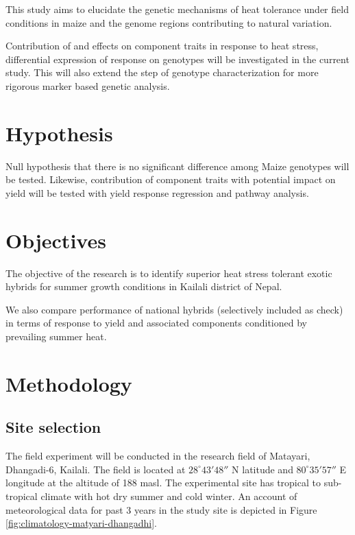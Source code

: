 \documentclass[
]{article}
\begin{document}
This study aims to elucidate the genetic mechanisms of heat tolerance under field conditions in maize and the genome regions contributing to natural variation.

Contribution of and effects on component traits in response to heat stress, differential expression of response on genotypes will be investigated in the current study. This will also extend the step of genotype characterization for more rigorous marker based genetic analysis.

\hypertarget{hypothesis}{%
\section{Hypothesis}\label{hypothesis}}

Null hypothesis that there is no significant difference among Maize genotypes will be tested. Likewise, contribution of component traits with potential impact on yield will be tested with yield response regression and pathway analysis.

\hypertarget{objectives}{%
\section{Objectives}\label{objectives}}

The objective of the research is to identify superior heat stress tolerant exotic hybrids for summer growth conditions in Kailali district of Nepal.

We also compare performance of national hybrids (selectively included as check) in terms of response to yield and associated components conditioned by prevailing summer heat.

\hypertarget{methodology}{%
\section{Methodology}\label{methodology}}

\hypertarget{site-selection}{%
\subsection{Site selection}\label{site-selection}}

The field experiment will be conducted in the research field of Matayari, Dhangadi-6, Kailali. The field is located at \(28^\circ 43' 48''\) N latitude and \(80^\circ 35' 57''\) E longitude at the altitude of 188 masl. The experimental site has tropical to sub-tropical climate with hot dry summer and cold winter. An account of meteorological data for past 3 years in the study site is depicted in Figure \ref{fig:climatology-matyari-dhangadhi}.
\end{document}
